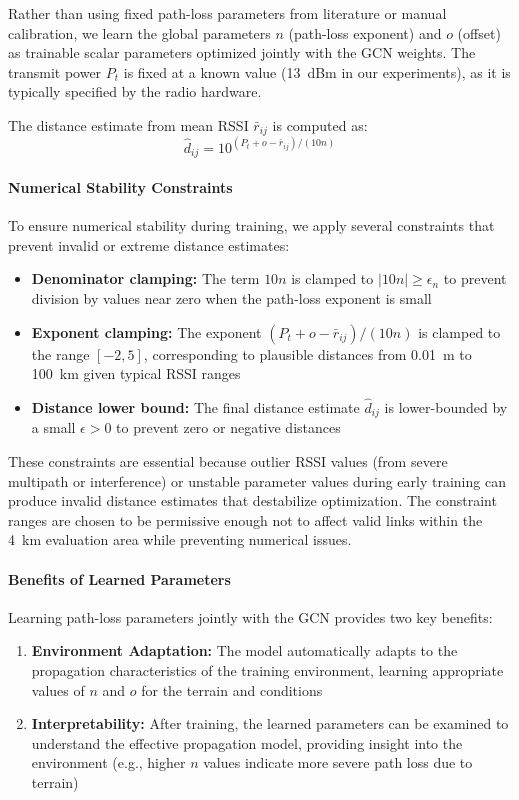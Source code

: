 \documentclass[master,final,11pt]{iscs-thesis}
\begin{document}
Rather than using fixed path-loss parameters from literature or manual calibration, we learn the global parameters $n$ (path-loss exponent) and $o$ (offset) as trainable scalar parameters optimized jointly with the GCN weights.
The transmit power $P_t$ is fixed at a known value (13~dBm in our experiments), as it is typically specified by the radio hardware.

The distance estimate from mean RSSI $\bar{r}_{ij}$ is computed as:
\begin{equation}
    \hat{d}_{ij} = 10^{(P_t + o - \bar{r}_{ij}) / (10n)}
\end{equation}

\paragraph{Numerical Stability Constraints}
To ensure numerical stability during training, we apply several constraints that prevent invalid or extreme distance estimates:
\begin{itemize}
    \item \textbf{Denominator clamping:} The term $10n$ is clamped to $|10n| \geq \epsilon_n$ to prevent division by values near zero when the path-loss exponent is small
    \item \textbf{Exponent clamping:} The exponent $(P_t + o - \bar{r}_{ij}) / (10n)$ is clamped to the range $[-2, 5]$, corresponding to plausible distances from 0.01~m to 100~km given typical RSSI ranges
    \item \textbf{Distance lower bound:} The final distance estimate $\hat{d}_{ij}$ is lower-bounded by a small $\epsilon > 0$ to prevent zero or negative distances
\end{itemize}

These constraints are essential because outlier RSSI values (from severe multipath or interference) or unstable parameter values during early training can produce invalid distance estimates that destabilize optimization.
The constraint ranges are chosen to be permissive enough not to affect valid links within the 4~km evaluation area while preventing numerical issues.

\paragraph{Benefits of Learned Parameters}
Learning path-loss parameters jointly with the GCN provides two key benefits:
\begin{enumerate}
    \item \textbf{Environment Adaptation:} The model automatically adapts to the propagation characteristics of the training environment, learning appropriate values of $n$ and $o$ for the terrain and conditions
    \item \textbf{Interpretability:} After training, the learned parameters can be examined to understand the effective propagation model, providing insight into the environment (e.g., higher $n$ values indicate more severe path loss due to terrain)
\end{enumerate}
\end{document}
